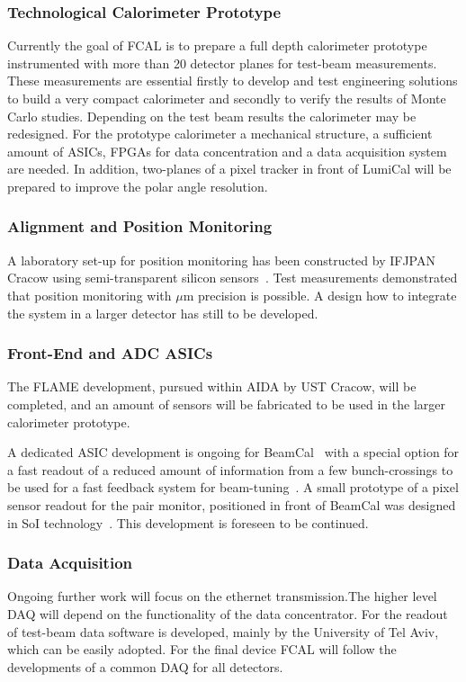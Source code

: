 \subsubsection{Technological Calorimeter Prototype}

Currently the goal of FCAL is to prepare a full depth calorimeter prototype instrumented with more than 20
detector planes for test-beam measurements. These measurements
are essential firstly to develop and test engineering solutions to build a very compact calorimeter and
secondly to verify the results of Monte Carlo studies. Depending on the test beam
results the calorimeter may be redesigned.
For the prototype calorimeter
a mechanical structure, a sufficient amount of ASICs, FPGAs for
data concentration and
a data acquisition system are needed. In addition, 
two-planes of a pixel tracker in front of LumiCal will be prepared to improve the polar angle resolution.

\subsubsection{Alignment and Position Monitoring }

A laboratory set-up for position monitoring has been constructed by IFJPAN Cracow using semi-transparent
silicon sensors~\cite{EUDETREPORT-2008-05}. Test measurements demonstrated that position monitoring 
with $\mu$m precision is possible. A design how to integrate the system in a larger detector has still to be developed. 

\subsubsection{Front-End and ADC ASICs}

The FLAME development, pursued within AIDA by UST Cracow, will be completed, and an amount of sensors will be fabricated
to be used in the larger calorimeter prototype.

A dedicated ASIC development is ongoing for BeamCal~\cite{6200898}
with a special option for a fast readout of a reduced amount of
information from a few bunch-crossings to be used for a fast feedback system for beam-tuning~\cite{1748-0221-3-10-P10004}.
A small prototype of a pixel sensor readout for the pair monitor, positioned in front of BeamCal was designed in SoI
technology~\cite{Sato201153}. This development is foreseen to be continued.

\subsubsection{Data Acquisition}

Ongoing further work will focus on the ethernet transmission.The higher level DAQ will depend on the functionality of the 
data concentrator. For the readout of test-beam data software is developed, mainly by the University of Tel Aviv,
which can be easily adopted. For the final device FCAL will follow the developments of a common DAQ for all detectors.
